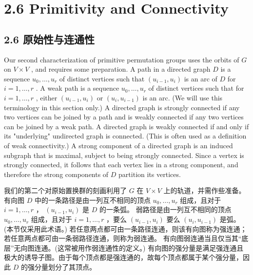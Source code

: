 \documentclass[10pt]{article}
\begin{document}
\section*{2.6 Primitivity and Connectivity}

\begin{tcolorbox}\relax
\section*{2.6 原始性与连通性}
\end{tcolorbox}

Our second characterization of primitive permutation groups uses the orbits of \(G\) on \(V \times  V\) , and requires some preparation. A path in a directed graph \(D\) is a sequence \({u}_{0},\ldots ,{u}_{r}\) of distinct vertices such that \(\left( {{u}_{i - 1},{u}_{i}}\right)\) is an arc of \(D\) for \(i = 1,\ldots ,r\) . A weak path is a sequence \({u}_{0},\ldots ,{u}_{r}\) of distinct vertices such that for \(i = 1,\ldots ,r\) , either \(\left( {{u}_{i - 1},{u}_{i}}\right)\) or \(\left( {{u}_{i},{u}_{i - 1}}\right)\) is an arc. (We will use this terminology in this section only.) A directed graph is strongly connected if any two vertices can be joined by a path and is weakly connected if any two vertices can be joined by a weak path. A directed graph is weakly connected if and only if its "underlying" undirected graph is connected. (This is often used as a definition of weak connectivity.) A strong component of a directed graph is an induced subgraph that is maximal, subject to being strongly connected. Since a vertex is strongly connected, it follows that each vertex lies in a strong component, and therefore the strong components of \(D\) partition its vertices.

\begin{tcolorbox}\relax
我们的第二个对原始置换群的刻画利用了 \(G\) 在 \(V \times  V\) 上的轨道，并需作些准备。 有向图 \(D\) 中的一条路径是由一列互不相同的顶点 \({u}_{0},\ldots ,{u}_{r}\) 组成，且对于 \(i = 1,\ldots ,r\) ， \(\left( {{u}_{i - 1},{u}_{i}}\right)\) 是 \(D\) 的一条弧。 弱路径是由一列互不相同的顶点 \({u}_{0},\ldots ,{u}_{r}\) 组成，且对于 \(i = 1,\ldots ,r\) ，要么 \(\left( {{u}_{i - 1},{u}_{i}}\right)\) 要么 \(\left( {{u}_{i},{u}_{i - 1}}\right)\) 是弧。(本节仅采用此术语。) 若任意两点都可由一条路径连通，则该有向图称为强连通；若任意两点都可由一条弱路径连通，则称为弱连通。 有向图弱连通当且仅当其“底层”无向图连通。(这常被用作弱连通性的定义。) 有向图的强分量是满足强连通且极大的诱导子图。由于每个顶点都是强连通的，故每个顶点都属于某个强分量，因此 \(D\) 的强分量划分了其顶点。
\end{tcolorbox}
\end{document}
